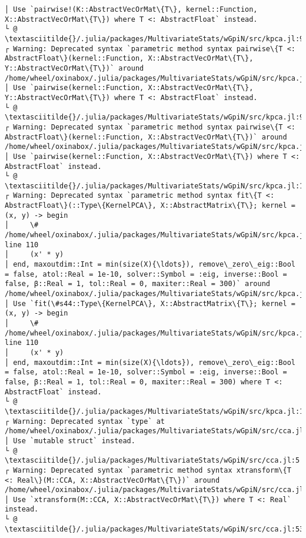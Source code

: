 \documentclass[11pt]{article}
\begin{document}
\begin{Verbatim}[commandchars=\\\{\}]
│ Use `pairwise!(K::AbstractVecOrMat\{T\}, kernel::Function, X::AbstractVecOrMat\{T\}) where T <: AbstractFloat` instead.
└ @ \textasciitilde{}/.julia/packages/MultivariateStats/wGpiN/src/kpca.jl:94
┌ Warning: Deprecated syntax `parametric method syntax pairwise\{T <: AbstractFloat\}(kernel::Function, X::AbstractVecOrMat\{T\}, Y::AbstractVecOrMat\{T\})` around /home/wheel/oxinabox/.julia/packages/MultivariateStats/wGpiN/src/kpca.jl:98.
│ Use `pairwise(kernel::Function, X::AbstractVecOrMat\{T\}, Y::AbstractVecOrMat\{T\}) where T <: AbstractFloat` instead.
└ @ \textasciitilde{}/.julia/packages/MultivariateStats/wGpiN/src/kpca.jl:98
┌ Warning: Deprecated syntax `parametric method syntax pairwise\{T <: AbstractFloat\}(kernel::Function, X::AbstractVecOrMat\{T\})` around /home/wheel/oxinabox/.julia/packages/MultivariateStats/wGpiN/src/kpca.jl:104.
│ Use `pairwise(kernel::Function, X::AbstractVecOrMat\{T\}) where T <: AbstractFloat` instead.
└ @ \textasciitilde{}/.julia/packages/MultivariateStats/wGpiN/src/kpca.jl:104
┌ Warning: Deprecated syntax `parametric method syntax fit\{T <: AbstractFloat\}(::Type\{KernelPCA\}, X::AbstractMatrix\{T\}; kernel = (x, y) -> begin
│     \# /home/wheel/oxinabox/.julia/packages/MultivariateStats/wGpiN/src/kpca.jl, line 110
│     (x' * y)
│ end, maxoutdim::Int = min(size(X){\ldots}), remove\_zero\_eig::Bool = false, atol::Real = 1e-10, solver::Symbol = :eig, inverse::Bool = false, β::Real = 1, tol::Real = 0, maxiter::Real = 300)` around /home/wheel/oxinabox/.julia/packages/MultivariateStats/wGpiN/src/kpca.jl:116.
│ Use `fit(\#s44::Type\{KernelPCA\}, X::AbstractMatrix\{T\}; kernel = (x, y) -> begin
│     \# /home/wheel/oxinabox/.julia/packages/MultivariateStats/wGpiN/src/kpca.jl, line 110
│     (x' * y)
│ end, maxoutdim::Int = min(size(X){\ldots}), remove\_zero\_eig::Bool = false, atol::Real = 1e-10, solver::Symbol = :eig, inverse::Bool = false, β::Real = 1, tol::Real = 0, maxiter::Real = 300) where T <: AbstractFloat` instead.
└ @ \textasciitilde{}/.julia/packages/MultivariateStats/wGpiN/src/kpca.jl:116
┌ Warning: Deprecated syntax `type` at /home/wheel/oxinabox/.julia/packages/MultivariateStats/wGpiN/src/cca.jl:5.
│ Use `mutable struct` instead.
└ @ \textasciitilde{}/.julia/packages/MultivariateStats/wGpiN/src/cca.jl:5
┌ Warning: Deprecated syntax `parametric method syntax xtransform\{T <: Real\}(M::CCA, X::AbstractVecOrMat\{T\})` around /home/wheel/oxinabox/.julia/packages/MultivariateStats/wGpiN/src/cca.jl:53.
│ Use `xtransform(M::CCA, X::AbstractVecOrMat\{T\}) where T <: Real` instead.
└ @ \textasciitilde{}/.julia/packages/MultivariateStats/wGpiN/src/cca.jl:53

\end{Verbatim}
\end{document}
